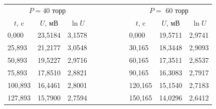 \documentclass[a4paper,12pt]{article} %
\begin{document}
\begin{enumerate}
\begin{table}[h!]
	\centering
	\begin{tabular}{lllccllllll}
		\cline{1-3} \cline{9-11}
		\multicolumn{3}{|c|}{$P = 40$ торр}                                                          &                      &                      &  &  & \multicolumn{1}{l|}{} & \multicolumn{3}{c|}{$P = $ 60 торр}                                                         \\ \cline{1-3} \cline{9-11} 
		\multicolumn{1}{|c|}{$t$, c}  & \multicolumn{1}{c|}{$U$, мВ} & \multicolumn{1}{c|}{$\ln{U}$} &                      &                      &  &  & \multicolumn{1}{l|}{} & \multicolumn{1}{c|}{$t$, c}  & \multicolumn{1}{c|}{$U$, мВ} & \multicolumn{1}{c|}{$\ln{U}$} \\ \cline{1-3} \cline{9-11} 
		\multicolumn{1}{|l|}{0,000}   & \multicolumn{1}{l|}{23,5184} & \multicolumn{1}{l|}{3,1578}   &                      &                      &  &  & \multicolumn{1}{l|}{} & \multicolumn{1}{l|}{0,000}   & \multicolumn{1}{l|}{19,5711} & \multicolumn{1}{l|}{2,9741}   \\ \cline{1-3} \cline{9-11} 
		\multicolumn{1}{|l|}{25,893}  & \multicolumn{1}{l|}{21,2177} & \multicolumn{1}{l|}{3,0548}   &                      &                      &  &  & \multicolumn{1}{l|}{} & \multicolumn{1}{l|}{30,165}  & \multicolumn{1}{l|}{18,3448} & \multicolumn{1}{l|}{2,9093}   \\ \cline{1-3} \cline{9-11} 
		\multicolumn{1}{|l|}{50,893}  & \multicolumn{1}{l|}{19,5227} & \multicolumn{1}{l|}{2,9716}   &                      &                      &  &  & \multicolumn{1}{l|}{} & \multicolumn{1}{l|}{60,165}  & \multicolumn{1}{l|}{17,3511} & \multicolumn{1}{l|}{2,8537}   \\ \cline{1-3} \cline{9-11} 
		\multicolumn{1}{|l|}{75,893}  & \multicolumn{1}{l|}{17,8510} & \multicolumn{1}{l|}{2,8821}   &                      &                      &  &  & \multicolumn{1}{l|}{} & \multicolumn{1}{l|}{90,165}  & \multicolumn{1}{l|}{16,3083} & \multicolumn{1}{l|}{2,7917}   \\ \cline{1-3} \cline{9-11} 
		\multicolumn{1}{|l|}{100,893} & \multicolumn{1}{l|}{16,4461} & \multicolumn{1}{l|}{2,8001}   &                      &                      &  &  & \multicolumn{1}{l|}{} & \multicolumn{1}{l|}{120,165} & \multicolumn{1}{l|}{15,1540} & \multicolumn{1}{l|}{2,7183}   \\ \cline{1-3} \cline{9-11} 
		\multicolumn{1}{|l|}{127,893} & \multicolumn{1}{l|}{15,7900} & \multicolumn{1}{l|}{2,7594}   &                      &                      &  &  & \multicolumn{1}{l|}{} & \multicolumn{1}{l|}{150,165} & \multicolumn{1}{l|}{14,0296} & \multicolumn{1}{l|}{2,6412}   \\ \cline{1-3} \cline{9-11} 

\end{tabular}
\end{table}
\end{enumerate}
\end{document}
